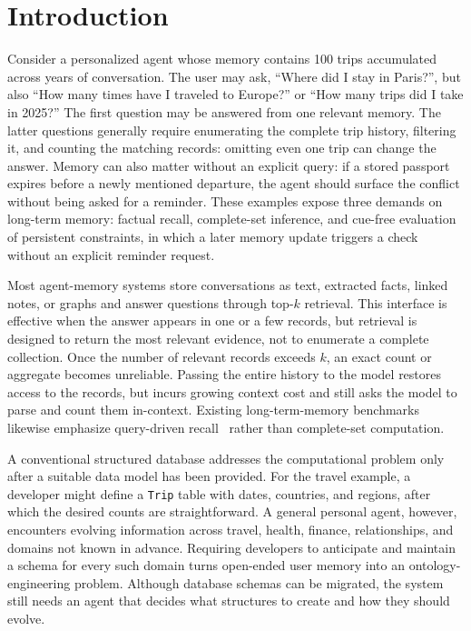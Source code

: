 \section{Introduction}
\label{sec:intro}

Consider a personalized agent whose memory contains 100 trips accumulated across years of conversation. The user may ask, ``Where did I stay in Paris?'', but also ``How many times have I traveled to Europe?'' or ``How many trips did I take in 2025?'' The first question may be answered from one relevant memory. The latter questions generally require enumerating the complete trip history, filtering it, and counting the matching records: omitting even one trip can change the answer. Memory can also matter without an explicit query: if a stored passport expires before a newly mentioned departure, the agent should surface the conflict without being asked for a reminder. These examples expose three demands on long-term memory: factual recall, complete-set inference, and cue-free evaluation of persistent constraints, in which a later memory update triggers a check without an explicit reminder request.

Most agent-memory systems store conversations as text, extracted facts, linked notes, or graphs and answer questions through top-$k$ retrieval. This interface is effective when the answer appears in one or a few records, but retrieval is designed to return the most relevant evidence, not to enumerate a complete collection. Once the number of relevant records exceeds $k$, an exact count or aggregate becomes unreliable. Passing the entire history to the model restores access to the records, but incurs growing context cost and still asks the model to parse and count them in-context. Existing long-term-memory benchmarks likewise emphasize query-driven recall~\citep{maharana2024locomo,wu2025longmemeval,hu2025memoryagentbench} rather than complete-set computation.

A conventional structured database addresses the computational problem only after a suitable data model has been provided. For the travel example, a developer might define a \texttt{Trip} table with dates, countries, and regions, after which the desired counts are straightforward. A general personal agent, however, encounters evolving information across travel, health, finance, relationships, and domains not known in advance. Requiring developers to anticipate and maintain a schema for every such domain turns open-ended user memory into an ontology-engineering problem. Although database schemas can be migrated, the system still needs an agent that decides what structures to create and how they should evolve.


